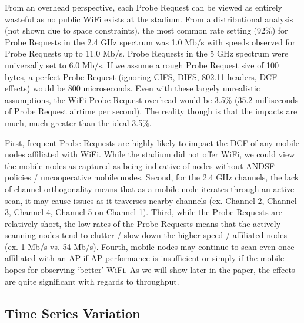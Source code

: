 \documentclass[conference]{IEEEtran}
\begin{document}
From an overhead perspective, each Probe Request can be viewed as entirely wasteful as no public WiFi exists at the stadium. From a distributional analysis (not shown due to space constraints), the most common rate setting (92\%) for Probe Requests in the 2.4 GHz spectrum was 1.0 Mb/s with speeds observed for Probe Requests up to 11.0 Mb/s. Probe Requests in the 5 GHz spectrum were universally set to 6.0 Mb/s. If we assume a rough Probe Request size of 100 bytes, a perfect Probe Request (ignoring CIFS, DIFS, 802.11 headers, DCF effects) would be 800 microseconds. Even with these largely unrealistic assumptions, the WiFi Probe Request overhead would be 3.5\% (35.2 milliseconds of Probe Request airtime per second). The reality though is that the impacts are much, much greater than the ideal 3.5\%.    

First, frequent Probe Requests are highly likely to impact the DCF of any mobile nodes affiliated with WiFi. While the stadium did not offer WiFi, we could view the mobile nodes as captured as being indicative of nodes without ANDSF policies / uncooperative mobile nodes.  Second, for the 2.4 GHz channels, the lack of channel orthogonality means that as a mobile node iterates through an active scan, it may cause issues as it traverses nearby channels (ex. Channel 2, Channel 3, Channel 4, Channel 5 on Channel 1).  Third, while the Probe Requests are relatively short, the low rates of the Probe Requests means that the actively scanning nodes tend to clutter / slow down the higher speed / affiliated nodes (ex. 1 Mb/s vs. 54 Mb/s).  Fourth, mobile nodes may continue to scan even once affiliated with an AP if AP performance is insufficient or simply if the mobile hopes for observing `better' WiFi.  As we will show later in the paper, the effects are quite significant with regards to throughput.  


\subsection{Time Series Variation}
\end{document}
